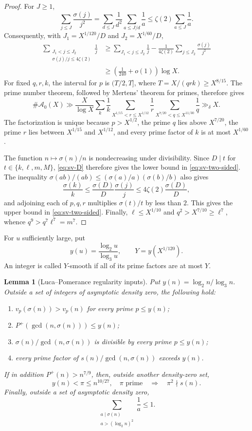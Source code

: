 \documentclass[11pt]{article}
\newtheorem{lemma}[theorem]{Lemma}
\theoremstyle{remark}
\newcommand{\1}{\mathbf 1}
\begin{document}
\begin{proof}
For $J\geq1$,
\[
 \sum_{j\leq J}\frac{\sigma(j)}{j^2}
 =\sum_{d\leq J}\frac1{d^2}\sum_{a\leq J/d}\frac1a
 \leq\zeta(2)\sum_{a\leq J}\frac1a.
\]
Consequently, with $J_1=X^{1/120}/D$ and $J_2=X^{1/60}/D$,
\begin{align*}
 \sum_{\substack{J_1<j\leq J_2\\ \sigma(j)/j\leq4\zeta(2)}}\frac1j
 &\geq \sum_{J_1<j\leq J_2}\frac1j
   -\frac1{4\zeta(2)}\sum_{j\leq J_2}\frac{\sigma(j)}{j^2}\\
 &\geq \left(\frac1{240}+o(1)\right)\log X.
\end{align*}
For fixed $q,r,k$, the interval for $p$ is $(T/2,T]$, where
$T=X/(qrk)\geq X^{8/15}$.  The prime number theorem, followed by Mertens'
theorem for primes, therefore gives
\[
 \#\mathcal A_0(X)
 \gg \frac{X}{\log X}
 \sum_k\frac1k
 \sum_{X^{1/15}<r\leq X^{1/12}}\frac1r
 \sum_{X^{7/20}<q\leq X^{11/30}}\frac1q
 \gg_\delta X.
\]
The factorization is unique because $p>X^{1/2}$, the prime $q$ lies above
$X^{7/20}$, the prime $r$ lies between $X^{1/15}$ and $X^{1/12}$, and
every prime factor of $k$ is at most $X^{1/60}$.

The function $n\mapsto\sigma(n)/n$ is nondecreasing under divisibility.
Since $D\mid t$ for $t\in\{k,\ell,m,M\}$, \eqref{eq:sv-D} therefore
gives the lower bound in \eqref{eq:sv-two-sided}.  The inequality
$\sigma(ab)/(ab)\leq(\sigma(a)/a)(\sigma(b)/b)$ also gives
\[
 \frac{\sigma(k)}k\leq
 \frac{\sigma(D)}D\frac{\sigma(j)}j
 \leq4\zeta(2)\frac{\sigma(D)}D,
\]
and adjoining each of $p,q,r$ multiplies $\sigma(t)/t$ by less than $2$.
This gives the upper bound in \eqref{eq:sv-two-sided}.  Finally,
$\ell\leq X^{1/10}$ and $q^2>X^{7/10}\geq\ell^7$, whence
$q^9>q^7\ell^7=m^7$.
\end{proof}

For $u$ sufficiently large, put
\[
  y(u)=\frac{\log_2u}{\log_3u},
  \qquad Y=y(X^{1/120}).
\]
An integer is called $Y$-smooth if all of its prime factors are at most
$Y$.

\begin{lemma}[Luca--Pomerance regularity inputs]\label{lem:LP-inputs}
Put $y(n)=\log_2n/\log_3n$.  Outside a set of integers of asymptotic density
zero, the following hold:
\begin{enumerate}
\item $v_p(\sigma(n))>v_p(n)$ for every prime $p\leq y(n)$;
\item $P^+(\gcd(n,\sigma(n)))\leq y(n)$;
\item $\sigma(n)/\gcd(n,\sigma(n))$ is divisible by every prime
      $p\leq y(n)$;
\item every prime factor of $s(n)/\gcd(n,\sigma(n))$ exceeds $y(n)$.
\end{enumerate}
If in addition $P^+(n)>n^{7/9}$, then, outside another density-zero set,
\[
 y(n)<\pi\leq n^{10/27},\quad \pi\text{ prime}
 \quad\Longrightarrow\quad \pi^2\nmid s(n).
\]
Finally, outside a set of asymptotic density zero,
\[
 \sum_{\substack{a\mid\sigma(n)\\a>(\log_2n)^2}}\frac1a\leq1.
\]
\end{lemma}
\end{document}
